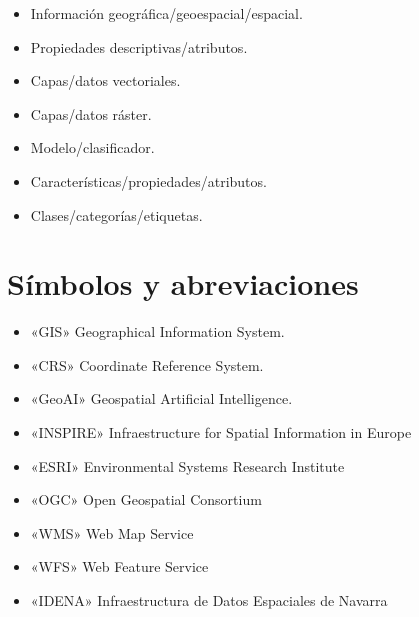 \begin{itemize}
  \item Información geográfica/geoespacial/espacial.
  \item Propiedades descriptivas/atributos.
  \item Capas/datos vectoriales.
  \item Capas/datos ráster.
  \item Modelo/clasificador.
  \item Características/propiedades/atributos.
  \item Clases/categorías/etiquetas.
\end{itemize}

\section*{Símbolos y abreviaciones}

\begin{itemize}
  \item «GIS» Geographical Information System.
  \item «CRS» Coordinate Reference System.
  \item «GeoAI» Geospatial Artificial Intelligence.
  \item «INSPIRE» Infraestructure for Spatial Information in Europe
  \item «ESRI» Environmental Systems Research Institute
  \item «OGC» Open Geospatial Consortium
  \item «WMS» Web Map Service
  \item «WFS» Web Feature Service
  \item «IDENA» Infraestructura de Datos Espaciales de Navarra
\end{itemize}




